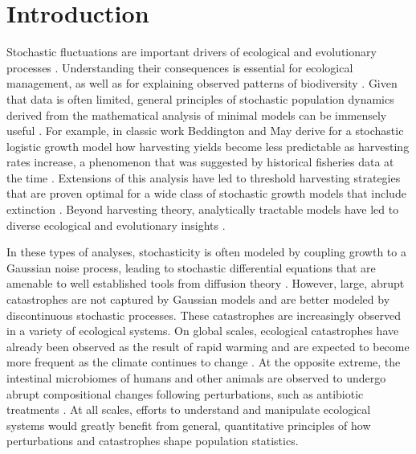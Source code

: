 \newpage

\section{Introduction}


Stochastic fluctuations are important drivers of ecological and evolutionary processes \cite{levins1968evolution,landeBook,melbingerSREP_2015,fisher2014transition}.  Understanding their consequences is essential for ecological management, as well as for explaining observed patterns of biodiversity \cite{landeBook}.  Given that data is often limited, general principles of stochastic population dynamics derived from the mathematical analysis of minimal models can be immensely useful  \cite{landeBook,hastings2016timescales}.  For example, in classic work  \cite{beddington1977harvesting} Beddington and May derive for a stochastic logistic growth model how harvesting yields become less predictable as harvesting rates increase, a phenomenon that was suggested by historical fisheries data at the time \cite{schaefer1957study}.  Extensions of this analysis have led to threshold harvesting strategies that are proven optimal for a wide class of stochastic growth models that include extinction \cite{lande1995optimal}.  Beyond harvesting theory, analytically tractable models have led to diverse ecological and evolutionary insights \cite{levins1968evolution,melbingerSREP_2015,dickens2016analytically}.

In these types of analyses, stochasticity is often modeled by coupling growth to a Gaussian noise process, leading to stochastic differential equations that are amenable to well established tools from diffusion theory \cite{landeBook,karlin1981second}.  However, large, abrupt catastrophes are not captured by Gaussian models and are better modeled by discontinuous stochastic processes.  These catastrophes are increasingly observed in a variety of ecological systems.  On global scales, ecological catastrophes have already been observed as the result of rapid warming and are expected to become more frequent as the climate continues to change \cite{pershing2015slow}.  At the opposite extreme, the intestinal microbiomes of humans and other animals are observed to undergo abrupt compositional changes following perturbations, such as antibiotic treatments \cite{trosvik2015biotic, caporaso2011moving, relmanABX_2011,wilesPLOS2016}.  At all scales, efforts to understand and manipulate ecological systems would greatly benefit from general, quantitative principles of how perturbations and catastrophes shape population statistics.

